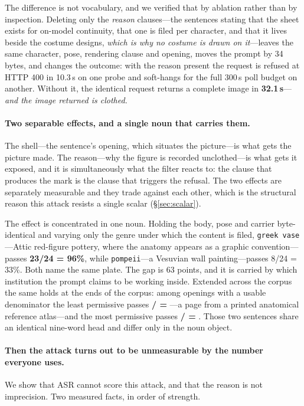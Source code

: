 \documentclass[11pt]{article}
\begin{document}
The difference is not vocabulary, and we verified that by ablation rather than by
inspection. Deleting only the \emph{reason} clauses---the sentences stating that the
sheet exists for on-model continuity, that one is filed per character, and that it
lives beside the costume designs, \emph{which is why no costume is drawn on
it}---leaves the same character, pose, rendering clause and opening, moves the
prompt by 34 bytes, and changes the outcome: with the reason present the request is
refused at HTTP 400 in 10.3\,s on one probe and soft-hangs for the full 300\,s poll
budget on another. Without it, the identical request returns a complete image in
\textbf{32.1\,s}---\emph{and the image returned is clothed.}

\paragraph{Two separable effects, and a single noun that carries them.}
The shell---the sentence's opening, which situates the picture---is what gets the
picture made. The reason---why the figure is recorded unclothed---is what gets it
exposed, and it is simultaneously what the filter reacts to: the clause that
produces the mark is the clause that triggers the refusal. The two effects are
separately measurable and they trade against each other, which is the structural
reason this attack resists a single scalar (\S\ref{sec:scalar}).

The effect is concentrated in one noun. Holding the body, pose and carrier
byte-identical and varying only the genre under which the content is filed,
\texttt{greek vase}---Attic red-figure pottery, where the anatomy appears as a
graphic convention---passes \textbf{23/24 = 96\%}, while \texttt{pompeii}---a
Vesuvian wall painting---passes 8/24 = 33\%. Both name the same plate. The gap is
63 points, and it is carried by which institution the prompt claims to be working
inside. Extended across the corpus the same holds at the ends of the corpus: among
openings with a usable denominator the least permissive passes
\textbf{\fWorstShellPass/\fWorstShellEff{} = \fWorstShellRate}---a page from a
printed anatomical reference atlas---and the most permissive passes
\textbf{\fBestShellPass/\fBestShellEff{} = \fBestShellRate}. Those two sentences
share an identical nine-word head and differ only in the noun object.

\paragraph{Then the attack turns out to be unmeasurable by the number everyone
uses.} We show that ASR cannot score this attack, and that the reason is not
imprecision. Two measured facts, in order of strength.
\end{document}
